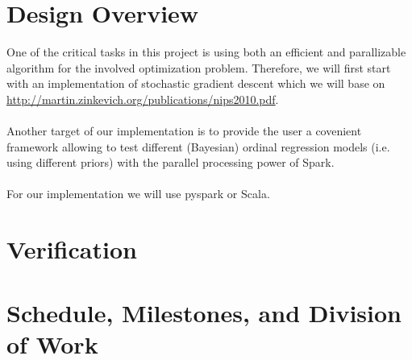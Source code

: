 \documentclass{article}
\begin{document}
	\section{Design Overview}
	One of the critical tasks in this project is using both an efficient and parallizable algorithm for the involved optimization problem. Therefore, we will first start with an implementation of stochastic gradient descent which we will base on \url{http://martin.zinkevich.org/publications/nips2010.pdf}.
	\\
	\\
	Another target of our implementation is to provide the user a covenient framework allowing to test different (Bayesian) ordinal regression models (i.e. using different priors) with the parallel processing power of Spark. 
	\\
	\\
	For our implementation we will use pyspark or Scala.
	\section{Verification}

	\section{Schedule, Milestones, and Division of Work}
\end{document}
